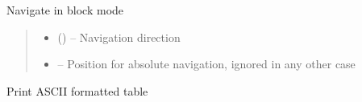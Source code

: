 \documentclass[letterpaper,10pt,english]{sphinxmanual}
\begin{document}
\begin{savenotes}
\begin{fulllineitems}
\begin{savenotes}\begin{fulllineitems}
\label{\detokenize{eezz:eezz.table.TTable.navigate}}
\pysigstartsignatures
{}
\pysigstopsignatures
\sphinxAtStartPar
Navigate in block mode
\begin{quote}\begin{description}
\begin{itemize}
\item {} 
\sphinxAtStartPar
{} ({\hyperref[\detokenize{eezz:eezz.table.TNavigation}]{}}) – Navigation direction

\item {} 
\sphinxAtStartPar
{} – Position for absolute navigation, ignored in any other case

\end{itemize}

\end{description}\end{quote}

\end{fulllineitems}\end{savenotes}


\begin{savenotes}\begin{fulllineitems}
\label{\detokenize{eezz:eezz.table.TTable.print}}
\pysigstartsignatures
{}
\pysigstopsignatures
\sphinxAtStartPar
Print ASCII formatted table

\end{fulllineitems}\end{savenotes}


\end{fulllineitems}\end{savenotes}
\end{document}
